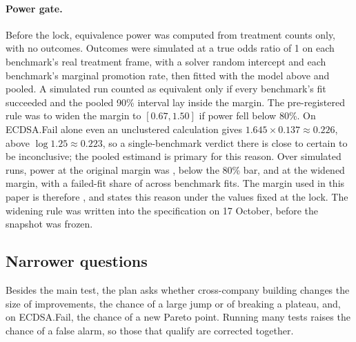 \paragraph{Power gate.}
Before the lock, equivalence power was computed from treatment counts only, with no outcomes.
Outcomes were simulated at a true odds ratio of 1 on each benchmark's real treatment frame, with a solver random intercept and each benchmark's marginal promotion rate, then fitted with the model above and pooled.
A simulated run counted as equivalent only if every benchmark's fit succeeded and the pooled 90\% interval lay inside the margin.
The pre-registered rule was to widen the margin to $[0.67, 1.50]$ if power fell below 80\%.
On ECDSA.Fail alone even an unclustered calculation gives $1.645 \times 0.137 \approx 0.226$, above $\log 1.25 \approx 0.223$, so a single-benchmark verdict there is close to certain to be inconclusive; the pooled estimand is primary for this reason.
Over \PowerSims{} simulated runs, power at the original margin was \PowerEquivalence{}, below the 80\% bar, and \PowerWidened{} at the widened margin, with a failed-fit share of \PowerFailedShare{} across benchmark fits.
The margin used in this paper is therefore \MarginFinal{}, and  states this reason under the values fixed at the lock.
The widening rule was written into the specification on 17 October, before the snapshot was frozen.

\subsection{Narrower questions}
\label{sec:secondary}

Besides the main test, the plan asks whether cross-company building changes the size of improvements, the chance of a large jump or of breaking a plateau, and, on ECDSA.Fail, the chance of a new Pareto point. Running many tests raises the chance of a false alarm, so those that qualify are corrected together.

